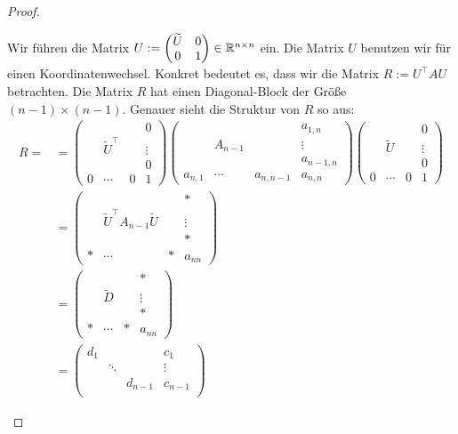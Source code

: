 \begin{proof}
\begin{itemize}
			Wir führen die Matrix $ U := \begin{pmatrix}
					\widetilde{U} & 0 \\
					0 & 1
				\end{pmatrix} \in \mathbb R^{n \times n} $ ein. Die Matrix $U$ benutzen wir für einen Koordinatenwechsel. Konkret bedeutet es, dass wir die Matrix $R := U^\top A U$ betrachten. Die Matrix $R$ hat einen Diagonal-Block der Größe $(n-1) \times (n-1)$. Genauer sieht die Struktur von $R$ so aus: 
			\begin{align*}
				R =  &= \begin{pmatrix}
					&&& 0 \\
					& \widetilde{U}^\top && \vdots \\
					&&& 0 \\
					0 & \cdots & 0 & 1
				\end{pmatrix} \begin{pmatrix}
					&&& a_{1,n} \\
					& A_{n-1} && \vdots \\
					&&& a_{n-1,n} \\
					a_{n,1} & \cdots & a_{n,n-1} & a_{n,n}
				\end{pmatrix} \begin{pmatrix}
					&&& 0 \\
					& \widetilde{U} && \vdots \\
					&&& 0 \\
					0 & \cdots & 0 & 1
				\end{pmatrix} \\
				&= \begin{pmatrix}
					&&& \ast \\
					& \widetilde{U}^\top A_{n-1} \widetilde{U} && \vdots \\
					&&& \ast \\
					\ast & \cdots & \ast & a_{nn}
				\end{pmatrix}
				\\ & = \begin{pmatrix}
					&&& \ast \\
					& \widetilde{D} && \vdots \\
					&&& \ast \\
					\ast & \cdots & \ast & a_{nn}
				\end{pmatrix} \\
				&= \begin{pmatrix}
					d_1 &&& c_1 \\
					& \ddots && \vdots \\
					&& d_{n-1} & c_{n-1} \\

\end{pmatrix}
\end{align*}
\end{itemize}
\end{proof}

